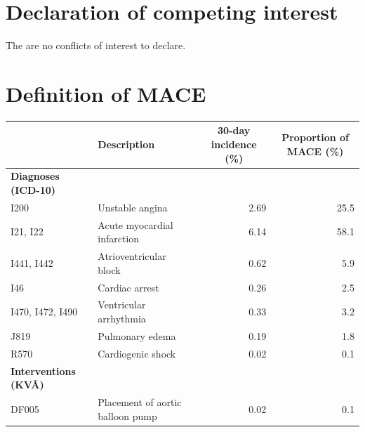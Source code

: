 \documentclass[preprint]{elsarticle}
\begin{document}
\section*{Declaration of competing interest}
The are no conflicts of interest to declare.



\appendix
\section{Definition of MACE}
\label{sec:appendix:mace}

\renewcommand{\arraystretch}{1.2}
\begin{table}[H]
  \centering
  \scriptsize
\begin{adjustbox}{center}
\begin{tabular}{@{}p{3.1cm}lrr@{}}
\toprule
& \multicolumn{1}{l}{\textbf{Description}} & \multicolumn{1}{c}{\textbf{30-day incidence (\%)}} & \multicolumn{1}{c}{\textbf{Proportion of MACE (\%)}} \\
\midrule
\textbf{Diagnoses (ICD-10)} & & & \\
\midrule
I200                                          & Unstable angina                                        &  2.69       &   25.5   \\
I21, I22                                      & Acute myocardial infarction                            &  6.14       &   58.1   \\
I441, I442                                    & Atrioventricular block                                 &  0.62       &    5.9   \\
I46                                           & Cardiac arrest                                         &  0.26       &    2.5   \\
I470, I472, I490                              & Ventricular arrhythmia                                 &  0.33       &    3.2   \\
J819                                          & Pulmonary edema                                        &  0.19       &    1.8   \\
R570                                          & Cardiogenic shock                                      &  0.02       &    0.1   \\
\midrule
\textbf{Interventions (KV\AA{})} & & & \\
\midrule
DF005                                         & Placement of aortic balloon pump                       &  0.02       &    0.1   \\

\end{tabular}
\end{adjustbox}
\end{table}
\end{document}
